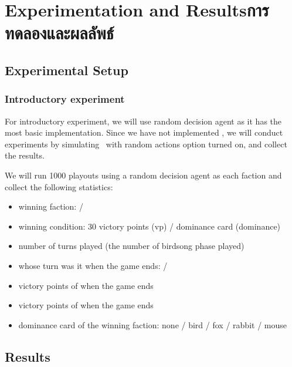 \chapter{
    \ifenglish Experimentation and Results\else การทดลองและผลลัพธ์\fi
}



\section{Experimental Setup}

\subsection{Introductory experiment}
For introductory experiment, we will use random decision agent as it has the most basic implementation. Since we have not implemented \RootAI, we will conduct experiments by simulating \RootOurs \ with random actions option turned on, and collect the results. 

We will run 1000 \glspl{playout} using a random decision agent as each faction and collect the following statistics:
\begin{itemize}
    \item winning faction: \Marquise{} / \Eyrie
    \item winning condition: 30 victory points (vp) / dominance card (dominance)
    \item number of turns played (the number of birdsong phase played)
    \item whose turn was it when the game ends: \Marquise{} / \Eyrie
    \item victory points of \Marquise{} when the game ends
    \item victory points of \Eyrie{} when the game ends
    \item dominance card of the winning faction: none / bird / fox / rabbit / mouse
\end{itemize}

\section{Results}

